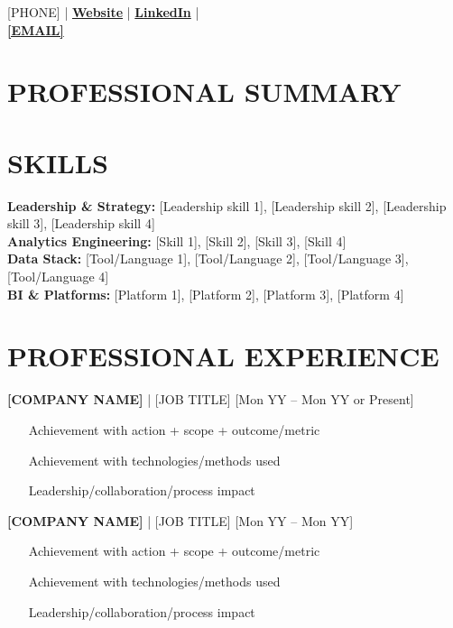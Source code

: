 \documentclass[9pt, letterpaper]{article}
\begin{document}
	\pagestyle{empty}

	 \hfill [PHONE] | \href{[WEBSITE URL]}{\textbf{Website}} | \href{[LINKEDIN URL]}{\textbf{LinkedIn}} |
	\\
	 \hfill \href{mailto:[EMAIL]}{\textbf{[EMAIL]}}

	\section*{PROFESSIONAL SUMMARY}

	\section*{SKILLS}
	\noindent \textbf{Leadership \& Strategy:} [Leadership skill 1], [Leadership skill 2], [Leadership skill 3], [Leadership skill 4] \\
	\noindent \textbf{Analytics Engineering:} [Skill 1], [Skill 2], [Skill 3], [Skill 4] \\
	\noindent \textbf{Data Stack:} [Tool/Language 1], [Tool/Language 2], [Tool/Language 3], [Tool/Language 4] \\
	\noindent \textbf{BI \& Platforms:} [Platform 1], [Platform 2], [Platform 3], [Platform 4]

	\section*{PROFESSIONAL EXPERIENCE}

	\noindent \textbf{[COMPANY NAME]} | [JOB TITLE] \hfill [Mon YY -- Mon YY or Present]
	\begin{itemize}[noitemsep, topsep=1pt, leftmargin=1.5em, rightmargin=3.5cm]
		\item [Achievement with action + scope + outcome/metric]
		\item [Achievement with technologies/methods used]
		\item [Leadership/collaboration/process impact]
	\end{itemize}

	\noindent \textbf{[COMPANY NAME]} | [JOB TITLE] \hfill [Mon YY -- Mon YY]
	\begin{itemize}[noitemsep, topsep=1pt, leftmargin=1.5em, rightmargin=3.5cm]
		\item [Achievement with action + scope + outcome/metric]
		\item [Achievement with technologies/methods used]
		\item [Leadership/collaboration/process impact]
	\end{itemize}
\end{document}
